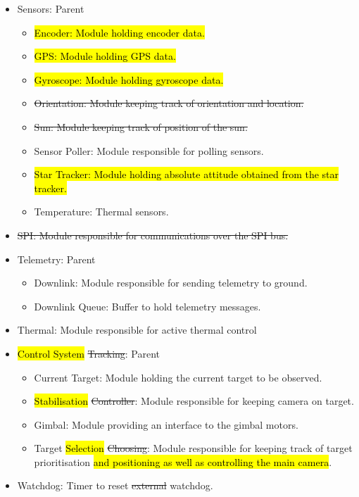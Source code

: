 \begin{itemize}
	\item Sensors: Parent
		\begin{itemize}
            \item \hl{Encoder: Module holding encoder data.}
            \item \hl{GPS: Module holding GPS data.}
            \item \hl{Gyroscope: Module holding gyroscope data.}
			\item \st{Orientation: Module keeping track of orientation and location.}
			\item \st{Sun: Module keeping track of position of the sun.}
			\item Sensor Poller: Module responsible for polling sensors.
            \item \hl{Star Tracker: Module holding absolute attitude obtained from the star tracker.}
			\item Temperature: Thermal sensors.
		\end{itemize}

	\item \st{SPI: Module responsible for communications over the SPI bus.}

	\item Telemetry: Parent
		\begin{itemize}
			\item Downlink: Module responsible for sending telemetry to ground.
			\item Downlink Queue: Buffer to hold telemetry messages.
		\end{itemize}

	\item Thermal: Module responsible for active thermal control

	\item \hl{Control System} \st{Tracking}: Parent
		\begin{itemize}
			\item Current Target: Module holding the current target to be observed.
			\item \hl{Stabilisation} \st{Controller}: Module responsible for keeping camera on target.
			\item Gimbal: Module providing an interface to the gimbal motors.
			\item Target \hl{Selection} \st{Choosing}: Module responsible for keeping track of target prioritisation \hl{and positioning as well as controlling the main camera}.
		\end{itemize}

	\item Watchdog: Timer to reset \st{external} watchdog.

\end{itemize}

